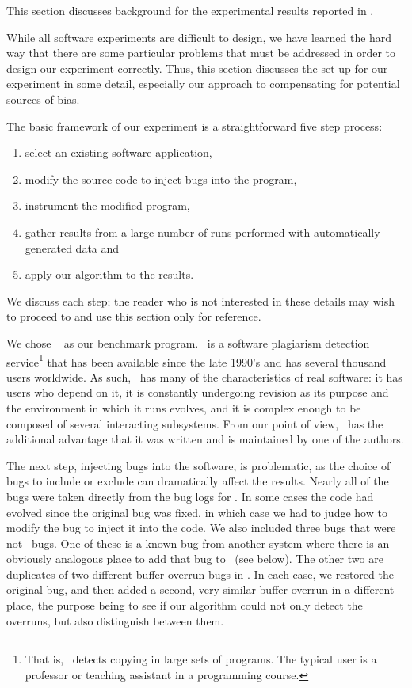 This section discusses background for the experimental results
reported in .

While all software experiments are difficult to design, we have
learned the hard way that there are some particular problems that must
be addressed in order to design our experiment correctly.
Thus, this section discusses the set-up for our
experiment in some detail, especially our approach to compensating for
potential sources of bias.

The basic framework of our experiment is a straightforward five step
process:
\begin{enumerate}
\item select an existing software application,
\item modify the source code to inject bugs into the program,
\item instrument the modified program,
\item gather results from a large number of runs performed with automatically generated data and
\item apply our algorithm to the results.
\end{enumerate}
We discuss each step; the reader who is not interested in
these details may wish to proceed to  and
use this section only for reference.

We chose \moss\ \cite{Schleimer:2003:WLA} as our benchmark program.  \moss\ is a
software plagiarism detection service\footnote{That is,
\moss\ detects copying in large sets of programs.  The typical \moss
user is a professor or teaching assistant in a programming course.}
that has been available since the late 1990's and has several thousand
users worldwide.  As such, \moss\ has many of the characteristics of
real software: it has users who depend on it, it is constantly
undergoing revision as its purpose and the environment in which it
runs evolves, and it is complex enough to be composed of several
interacting subsystems.
From our point of view, \moss\ has the additional advantage that it
was written and is maintained by one of the authors.

The next step, injecting bugs into the software, is problematic, as
the choice of bugs to include or exclude can dramatically affect the
results.  Nearly all of the bugs were taken directly from the bug
logs for \moss.  In some cases the code had evolved since the original
bug was fixed, in which case we had to judge how to modify the
bug to inject it into the code.  We also included three bugs that
were not \moss\ bugs.  One of these is a known bug from another system
where there is an obviously analogous place to add that bug to \moss\
(see below). The other two are duplicates of two different buffer
overrun bugs in \moss.  In each case, we restored the original bug,
and then added a second, very similar buffer overrun in a different
place, the purpose being to see if our algorithm could not only detect
the overruns, but also distinguish between them.

